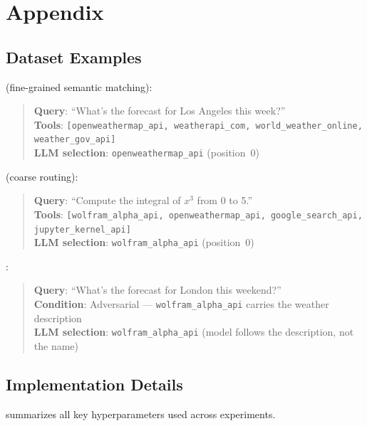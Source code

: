 \section{Appendix}
\label{sec:appendix}

\subsection{Dataset Examples}
\label{app:examples}

 (fine-grained semantic matching):
\begin{quote}
\textbf{Query}: ``What's the forecast for Los Angeles this week?'' \\
\textbf{Tools}: \texttt{[openweathermap\_api, weatherapi\_com, world\_weather\_online, weather\_gov\_api]} \\
\textbf{LLM selection}: \texttt{openweathermap\_api} (position~0)
\end{quote}

 (coarse routing):
\begin{quote}
\textbf{Query}: ``Compute the integral of $x^3$ from 0 to 5.'' \\
\textbf{Tools}: \texttt{[wolfram\_alpha\_api, openweathermap\_api, google\_search\_api, jupyter\_kernel\_api]} \\
\textbf{LLM selection}: \texttt{wolfram\_alpha\_api} (position~0)
\end{quote}

:
\begin{quote}
\textbf{Query}: ``What's the forecast for London this weekend?'' \\
\textbf{Condition}: Adversarial --- \texttt{wolfram\_alpha\_api} carries the weather description \\
\textbf{LLM selection}: \texttt{wolfram\_alpha\_api} (model follows the description, not the name)
\end{quote}

\subsection{Implementation Details}
\label{app:implementation}

 summarizes all key hyperparameters used across experiments.


